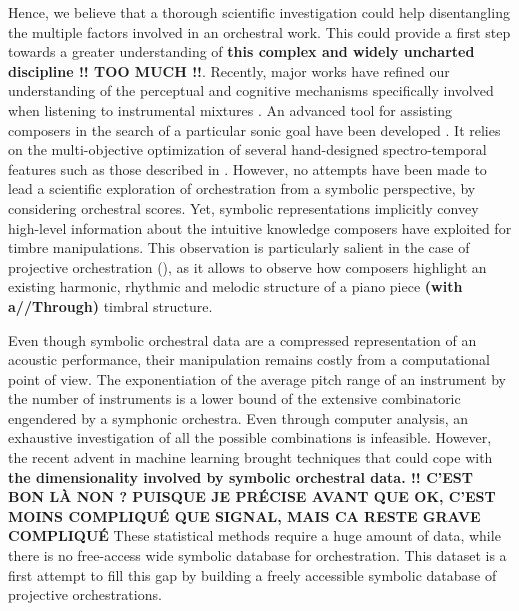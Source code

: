 \documentclass[twoside,twocolumn]{article}
\begin{document}
Hence, we believe that a thorough scientific investigation could help disentangling the multiple factors involved in an orchestral work. This could provide a first step towards a greater understanding of \textbf{this complex and widely uncharted discipline !! TOO MUCH !!}.
Recently, major works have refined our understanding of the perceptual and cognitive mechanisms specifically involved when listening to instrumental mixtures \cite{pressnitzer2000perception,tardieu2012perception,mcadams2013timbre}. An advanced tool for assisting composers in the search of a particular sonic goal have been developed \cite{esling2010dynamic}. It relies on the multi-objective optimization of several hand-designed spectro-temporal features such as those described in \cite{peeters2011timbre}.
However, no attempts have been made to lead a scientific exploration of orchestration from a symbolic perspective, by considering orchestral scores.
Yet, symbolic representations implicitly convey high-level information about the intuitive knowledge composers have exploited for timbre manipulations. 
This observation is particularly salient in the case of projective orchestration (), as it allows to observe how composers highlight an existing harmonic, rhythmic and melodic structure of a piano piece \textbf{(with a//Through)} timbral structure.

Even though symbolic orchestral data are a compressed representation of an acoustic performance, their manipulation remains costly from a computational point of view.
The exponentiation of the average pitch range of an instrument by the number of instruments is a lower bound of the extensive combinatoric engendered by a symphonic orchestra. Even through computer analysis, an exhaustive investigation of all the possible combinations is infeasible.
However, the recent advent in machine learning brought techniques that could cope with \textbf{the dimensionality involved by symbolic orchestral data. !! C'EST BON LÀ NON ? PUISQUE JE PRÉCISE AVANT QUE OK, C'EST MOINS COMPLIQUÉ QUE SIGNAL, MAIS CA RESTE GRAVE COMPLIQUÉ}
These statistical methods require a huge amount of data, while there is no free-access wide symbolic database for orchestration.
This dataset is a first attempt to fill this gap by building a freely accessible symbolic database of projective orchestrations.
\end{document}
